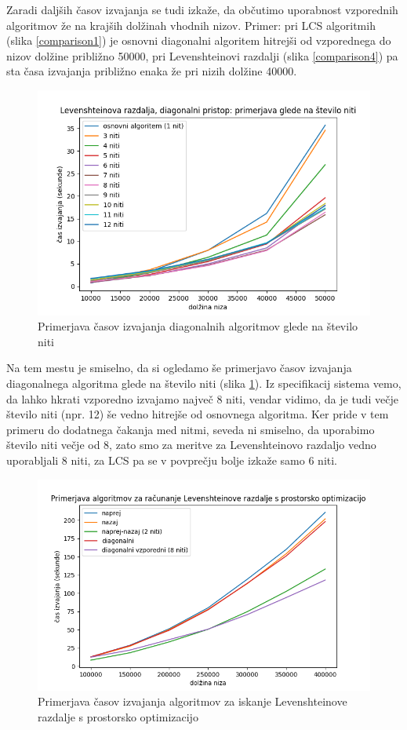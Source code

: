 \documentclass[a4paper,12pt,openright]{book}
\begin{document}
Zaradi daljših časov izvajanja se tudi izkaže, da občutimo uporabnost vzporednih algoritmov že na krajših dolžinah vhodnih nizov. Primer: pri LCS algoritmih (slika \ref{comparison1}) je osnovni diagonalni algoritem hitrejši od vzporednega do nizov dolžine približno 50000, pri Levenshteinovi razdalji (slika \ref{comparison4}) pa sta časa izvajanja približno enaka že pri nizih dolžine 40000. 

\begin{figure}[htb]
\centering
\includegraphics[width=1.0\textwidth]{plots/nThreads.png}
\caption{Primerjava časov izvajanja diagonalnih algoritmov glede na število niti}
\label{comparison5}
\end{figure}

Na tem mestu je smiselno, da si ogledamo še primerjavo časov izvajanja diagonalnega algoritma glede na število niti (slika \ref{comparison5}). Iz specifikacij sistema vemo, da lahko hkrati vzporedno izvajamo največ 8 niti, vendar vidimo, da je tudi večje število niti (npr. 12) še vedno hitrejše od osnovnega algoritma. Ker pride v tem primeru do dodatnega čakanja med nitmi, seveda ni smiselno, da uporabimo število niti večje od 8, zato smo za meritve za Levenshteinovo razdaljo vedno uporabljali 8 niti, za LCS pa se v povprečju bolje izkaže samo 6 niti. 

\begin{figure}[H]
\centering
\includegraphics[width=1.0\textwidth]{plots/LevenshteinSpace.png}
\caption{Primerjava časov izvajanja algoritmov za iskanje Levenshteinove razdalje s prostorsko optimizacijo}
\label{comparison6}
\end{figure}
\end{document}
